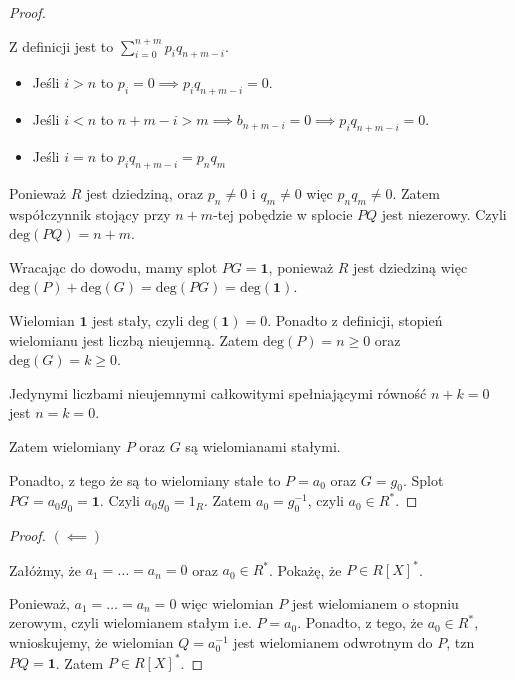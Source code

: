 \begin{solution}
\begin{proof}
\begin{remark}
		Z definicji jest to $\sum_{i=0}^{n+m} p_{i}q_{n+m-i}$. 
		\begin{itemize}
			\item Jeśli $i > n$ to $p_{i} = 0 \implies p_{i}q_{n+m-i} = 0$.
			\item Jeśli $i < n$ to  $n+m-i > m \implies b_{n+m-i} = 0 \implies p_{i}q_{n+m-i} = 0$.
			\item Jeśli $i = n$ to  $p_{i}q_{n+m-i} = p_{n}q_{m}$
		\end{itemize}

		Ponieważ $R$ jest dziedziną, oraz  $p_{n}\neq 0$ i $q_{m} \neq 0$ więc $p_{n}q_{m} \neq 0$. Zatem współczynnik stojący przy $n+m$-tej pobędzie w splocie $PQ$ jest niezerowy. Czyli $\text{deg}\left(PQ\right) = n + m$.
		\end{remark}
		
		Wracając do dowodu, mamy splot $PG = \mathbf{1}$, ponieważ $R$ jest dziedziną więc $\text{deg}\left(P\right) + \text{deg}\left(G\right) = \text{deg}\left(PG\right) = \text{deg}\left(\mathbf{1}\right) $. 

		Wielomian $\mathbf{1}$ jest stały, czyli $\text{deg}\left(\mathbf{1}\right) = 0$. Ponadto z definicji, stopień wielomianu jest liczbą nieujemną. Zatem $\text{deg}\left(P\right) = n \ge 0$ oraz $\text{deg}\left(G\right) = k \ge 0$.
		
		Jedynymi liczbami nieujemnymi całkowitymi spełniającymi równość $n + k = 0$ jest $n = k = 0$.

		Zatem wielomiany  $P$ oraz  $G$ są wielomianami stałymi. 

		Ponadto, z tego że są to wielomiany stałe to $P = a_{0}$ oraz $G = g_{0}$. Splot $PG = a_{0}g_{0} = \mathbf{1}$. Czyli $a_{0}g_{0} = 1_{R}$. Zatem $a_{0} = g_{0}^{-1}$, czyli $a_{0}\in R^{\ast} $.
	\end{proof} 

	\begin{proof}
		$\bm{ \left( \impliedby \right)  } $ 

		Załóżmy, że $a_{1} = \ldots = a_{n} = 0$ oraz $a_{0} \in R^{\ast} $. Pokażę, że $P\in R\left[ X \right] ^{\ast} $.
		
		Ponieważ, $a_1 = \ldots = a_{n} = 0$ więc wielomian $P$ jest wielomianem o stopniu zerowym, czyli wielomianem stałym i.e. $P = a_0$. Ponadto, z tego, że $a_0 \in R^{\ast} $, wnioskujemy, że wielomian $Q = a_0^{-1}$ jest wielomianem odwrotnym do $P$, tzn  $PQ = \mathbf{1}$. Zatem $P \in R\left[ X \right] ^{\ast} $.
	\end{proof} 
\end{solution} 
